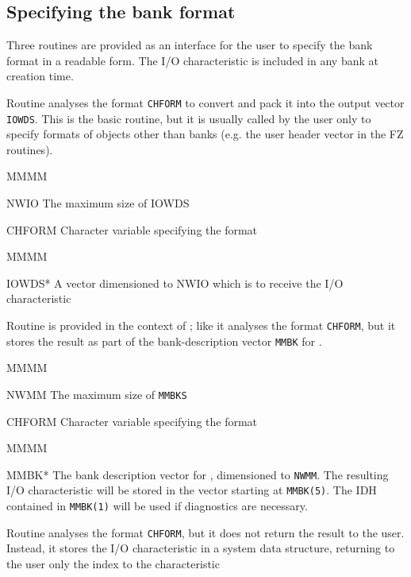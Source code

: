 \subsection{Specifying the bank format}
\par Three routines are provided as an interface for the user to
specify the bank format in a readable form.
The I/O characteristic is included in any bank at creation time.
\par Routine  analyses the format {\tt CHFORM} to convert
and pack it into the output vector {\tt IOWDS}.
This is the basic routine,
but it is usually called by the user only to specify formats
of objects other than banks
(e.g. the user header vector in the FZ routines).
\Idesc
\begin{DL}{MMMM}
\item[NWIO]The maximum size of IOWDS
\item[CHFORM]Character variable specifying the format
\end{DL}
\Odesc
\begin{DL}{MMMM}
\item[IOWDS*]A vector dimensioned to NWIO which is to receive the I/O characteristic
\end{DL}
\par Routine  is provided in the context of ;
like it analyses the format {\tt CHFORM},
but it stores the result as part of the bank-description vector
{\tt MMBK} for .
\Idesc
\begin{DL}{MMMM}
\item[NWMM]The maximum size of {\tt MMBKS}
\item[CHFORM]Character variable specifying the format
\end{DL}
\Odesc
\begin{DL}{MMMM}
\item[MMBK*]The bank description vector for , 
dimensioned to {\tt NWMM}.
The resulting I/O characteristic will be stored
in the vector starting at {\tt MMBK(5)}.
The IDH contained in {\tt MMBK(1)} will be used if diagnostics are necessary.
\end{DL}
\par Routine  analyses the format {\tt CHFORM},
but it does not return the result to the user.
Instead, it stores the I/O characteristic in a system data structure,
returning to the user only the index to the characteristic
